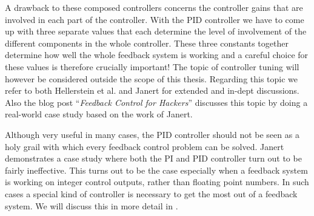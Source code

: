 A drawback to these composed controllers concerns the controller gains that are involved in each part of the controller. With the PID controller we have to come up with three separate values that each determine the level of involvement of the different components in the whole controller. These three constants together determine how well the whole feedback system is working and a careful choice for these values is therefore crucially important! The topic of controller tuning will however be considered outside the scope of this thesis. Regarding this topic we refer to both Hellerstein et al. and Janert \cite{hellerstein2004-feedback, janert2013-feedback} for extended and in-dept discussions. Also the blog post ``\textit{Feedback Control for Hackers}'' \cite{heest2015-feedback-for-hackers} discusses this topic by doing a real-world case study based on the work of Janert.

Although very useful in many cases, the PID controller should not be seen as a holy grail with which every feedback control problem can be solved. Janert \cite{janert2013-feedback} demonstrates a case study where both the PI and PID controller turn out to be fairly ineffective. This turns out to be the case especially when a feedback system is working on integer control outputs, rather than floating point numbers. In such cases a special kind of controller is necessary to get the most out of a feedback system. We will discuss this in more detail in .
